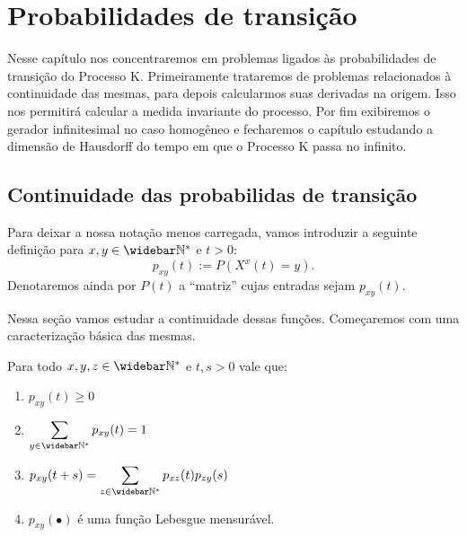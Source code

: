 \chapter{Probabilidades de transição}
\label{cap:taxas}

Nesse capítulo nos concentraremos em problemas ligados às
probabilidades de transição do Processo K. Primeiramente trataremos de
problemas relacionados à continuidade das mesmas, para depois
calcularmos suas derivadas na origem. Isso nos permitirá calcular a
medida invariante do processo.  Por fim exibiremos o gerador
infinitesimal no caso homogêneo e fecharemos o capítulo estudando a
dimensão de Hausdorff do tempo em que o Processo K passa no infinito.



\section{Continuidade das probabilidas de transição}
\label{sec:continuidade}

Para deixar a nossa notação menos carregada, vamos introduzir a
seguinte definição para $x, y \in \Nzb$ e $t > 0$:
\begin{displaymath}
  p_{xy} (t) := P(X^x(t) = y).
\end{displaymath}
Denotaremos ainda por $P(t)$ a ``matriz'' cujas entradas sejam $p_{xy}(t)$.

Nessa seção vamos estudar a continuidade dessas funções. Começaremos
com uma caracterização básica das mesmas.

\begin{proposicao}
  \label{prop:transicao-mensuravel}
  Para todo $x, y, z \in \Nzb$ e $t, s > 0$ vale que:
  \begin{enumerate}
  \item $p_{xy}(t) \geq 0$
  \item $\displaystyle \sum_{y \in \Nzb} p_{xy}(t) = 1$
  \item $\displaystyle p_{xy}(t+s) = \sum_{z\in\Nzb}p_{xz}(t)p_{zy}(s)$
  \item $p_{xy}(\bullet)$ é uma função Lebesgue mensurável.
  \end{enumerate}
\end{proposicao}

